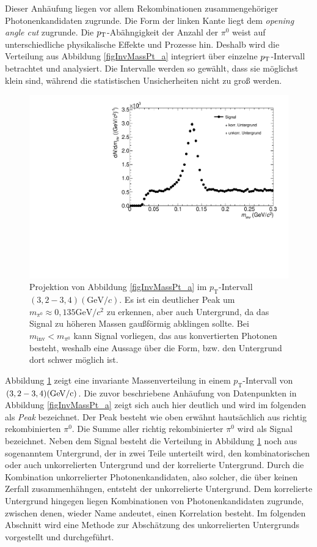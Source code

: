 Dieser Anh\"aufung liegen vor allem Rekombinationen zusammengeh\"origer Photonenkandidaten zugrunde.
Die Form der linken Kante liegt dem \textit{opening angle cut} zugrunde.
\newline
Die $p_{\rm{T}}$-Ab\"ahngigkeit der Anzahl der $\pi^{0}$ weist auf unterschiedliche physikalische Effekte und Prozesse hin.
Deshalb wird die Verteilung aus Abbildung \ref{figInvMassPt_a} integriert \"uber einzelne $p_{\rm{T}}$-Intervall betrachtet und analysiert.
Die Intervalle werden so gew{\"a}hlt, dass sie m{\"o}glichst klein sind, w{\"a}hrend die statistischen Unsicherheiten nicht zu gro{\ss} werden.
\begin{figure}[tbp]
\centering
\includegraphics[width=.75\linewidth]{hSignalPlusBkg.pdf}
\caption{Projektion von Abbildung \ref{figInvMassPt_a} im $p_{\text{T}}$-Intervall $(3,2 - 3,4) (\text{GeV/}c)$. Es ist ein deutlicher Peak um $m_{\pi^{0}} \approx 0,135\text{GeV/}c^{2}$ zu erkennen, aber auch Untergrund, da das Signal zu h{\"o}heren Massen gau{\ss}f{\"o}rmig abklingen sollte. Bei $m_{\text{inv}} < m_{\pi^{0}}$ kann Signal vorliegen, das aus konvertierten Photonen besteht, weshalb eine Aussage {\"u}ber die Form, bzw. den Untergrund dort schwer m{\"o}glich ist.}
\label{figSignalPlusBkg}
\end{figure}
\newline
Abbildung \ref{figSignalPlusBkg} zeigt eine invariante Massenverteilung in einem $p_{\text{T}}$-Intervall von $(3,2 - 3,4)(\rm{GeV/}c)$.
Die zuvor beschriebene Anh\"aufung von Datenpunkten in Abbildung \ref{figInvMassPt_a} zeigt sich auch hier deutlich und wird im folgenden als \textit{Peak} bezeichnet.
Der Peak besteht wie oben erw\"ahnt hauts\"achlich aus richtig rekombinierten $\pi^{0}$.
Die Summe aller richtig rekombinierter $\pi^{0}$ wird als Signal bezeichnet.
Neben dem Signal besteht die Verteilung in Abbildung \ref{figSignalPlusBkg} noch aus sogenanntem Untergrund, der in zwei Teile unterteilt wird, den kombinatorischen oder auch unkorrelierten Untergrund und der korrelierte Untergrund.
Durch die Kombination unkorrelierter Photonenkandidaten, also solcher, die \"uber keinen Zerfall zusammenh\"ahngen, entsteht der unkorrelierte Untergrund.
Dem korrelierte Untergrund hingegen liegen Kombinationen von Photonenkandidaten zugrunde, zwischen denen, wieder Name andeutet, einen Korrelation besteht.
\newline
Im folgenden Abschnitt wird eine Methode zur Absch\"atzung des unkorrelierten Untergrunds vorgestellt und durchgef\"uhrt. 